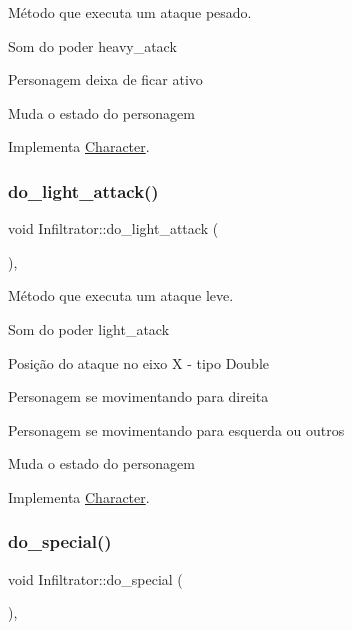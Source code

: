Método que executa um ataque pesado. 

Som do poder heavy\+\_\+atack

Personagem deixa de ficar ativo

Muda o estado do personagem 

Implementa \mbox{\hyperlink{classCharacter_aa9b20c9c53393c7aaf3a45e5c966c2ef}{Character}}.

\mbox{\label{classInfiltrator_a70b8134dac23d716f86139da77cd8927}} 
\subsubsection{\texorpdfstring{do\+\_\+light\+\_\+attack()}{do\_light\_attack()}}
{\footnotesize\ttfamily void Infiltrator\+::do\+\_\+light\+\_\+attack (\begin{DoxyParamCaption}{ }\end{DoxyParamCaption})\hspace{0.3cm}{\ttfamily [protected]}, {\ttfamily [virtual]}}



Método que executa um ataque leve. 

Som do poder light\+\_\+atack

Posição do ataque no eixo X -\/ tipo Double

Personagem se movimentando para direita

Personagem se movimentando para esquerda ou outros

Muda o estado do personagem 

Implementa \mbox{\hyperlink{classCharacter_ae45be8b8b1a7d2f54a2349a65e2e6c42}{Character}}.

\mbox{\label{classInfiltrator_ad8cbafc64c00e7e5617baccdbda80746}} 
\subsubsection{\texorpdfstring{do\+\_\+special()}{do\_special()}}
{\footnotesize\ttfamily void Infiltrator\+::do\+\_\+special (\begin{DoxyParamCaption}{ }\end{DoxyParamCaption})\hspace{0.3cm}{\ttfamily [protected]}, {\ttfamily [virtual]}}




